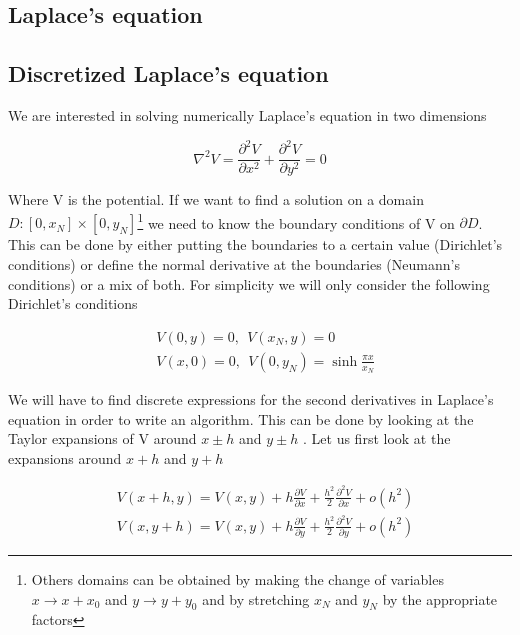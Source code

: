 \documentclass[10 pt]{article}
\numberwithin{equation}{section}
\begin{document}
\begin{multicols}{2}

\section{Laplace's equation}
\subsection{Discretized Laplace's equation}

We are interested in solving numerically Laplace's equation in two dimensions

\begin{equation}
\nabla ^2 V = \frac{\partial ^2 V}{\partial x^2} + \frac{\partial ^2 V}{\partial y^2} = 0
\end{equation}

Where V is the potential. If we want to find a solution on a domain $D : [0,x_N] \times [0,y_N]$\footnote{Others domains can be obtained by making the change of variables $x \rightarrow x + x_0$ and $y \rightarrow y + y_0$ and by stretching $x_N$ and $y_N$ by the appropriate factors} we need to know the boundary conditions of V on $\partial D$. This can be done by either putting the boundaries to a certain value (Dirichlet's conditions) or define the normal derivative at the boundaries (Neumann's conditions) or a mix of both. For simplicity we will only consider the following Dirichlet's conditions

\begin{equation}
\begin{split}
&V(0,y) = 0,\ \ V(x_N, y) = 0\\
&V(x, 0) = 0,\ \ V(0, y_N) = \sinh \frac{\pi x}{x_{N}}
\end{split}
\end{equation}

We will have to find discrete expressions for the second derivatives in Laplace's equation in order to write an algorithm. This can be done by looking at the Taylor expansions of V around $x\pm h$ and $y\pm h$ \cite{ComputationalTechnics}. Let us first look at the expansions around $x+h$ and $y+h$

\begin{equation}
\begin{split}
& V(x+h,y) = V(x,y)+h \frac{\partial V}{\partial x}  +\frac{h^2}{2}   \frac{\partial^2 V}{\partial x} +o(h^2)\\
& V(x,y+h) = V(x,y)+ h \frac{\partial V}{\partial y}  + \frac{h^2}{2}  \frac{\partial^2 V}{\partial y} +o(h^2)
\end{split}
\end{equation}


\end{multicols}
\end{document}
